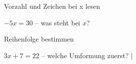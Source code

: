 \setcounter{aufgabe}{11}

\begin{aufgabe}{Vorzahl und Zeichen bei x lesen}
\begin{teile}
\teil $-5x = 30$ – was steht bei $x$? \leerfeld
\end{teile}
\end{aufgabe}

\begin{aufgabe}{Reihenfolge bestimmen}
\begin{teile}
\teil $3x + 7 = 22$ – welche Umformung zuerst? $\mid$ \leerfeld
\end{teile}
\end{aufgabe}

